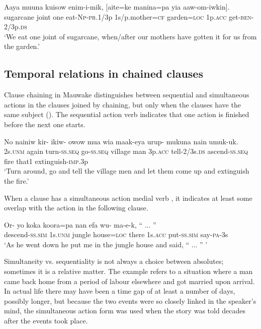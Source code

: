 \ea%
\label{ex:8:x1470}
\gll Aaya  muuna  kuisow  enim-i-mik,  [aite=ke manina=pa  yia  aaw-om-iwkin].   \\
sugarcane  joint  one  eat-\textsc{Np}-\textsc{pr}.1/3p 1s/p.mother=\textsc{cf} garden=\textsc{loc} 1p.\textsc{acc} get-\textsc{ben}-2/3p.\textsc{ds}\\
\glt`We eat one joint of sugarcane, when/after our mothers have gotten it for us from the garden.'
\z


\subsection{Temporal relations in chained clauses}

Clause chaining in Mauwake distinguishes between sequential and simultaneous actions in the clauses joined by chaining, but only when the clauses have the same subject (). The sequential action verb  indicates that one action is finished before the next one starts. 

\ea%
\label{ex:8:x1431}
\gll No  nainiw  kir-  ikiw-  owow  mua  wia maak-eya  urup-  mukuna  nain  umuk-uk. \\
2s.\textsc{unm} again  turn-\textsc{ss}.\textsc{seq} go-\textsc{ss}.\textsc{seq} village  man  3p.\textsc{acc} tell-2/3s.\textsc{ds}  ascend-\textsc{ss}.\textsc{seq} fire  that1 extinguish-\textsc{imp}.3p\\
\glt`Turn around, go and tell the village men and let them come up and extinguish the fire.'
\z


When a clause has a simultaneous action medial verb , it indicates at least some overlap with the action in the following clause. 

\ea%
\label{ex:8:x1432}
\gll Or-  yo  koka  koora=pa  nan  efa wu-  ma-e-k,  `` ... '' \\
descend-\textsc{ss}.\textsc{sim} 1s.\textsc{unm} jungle house=\textsc{loc} there 1s.\textsc{acc} put-\textsc{ss}.\textsc{sim} say-\textsc{pa}-3s\\
\glt`As he went down he put me in the jungle house and said, `` ... '' '
\z


Simultaneity vs. sequentiality is not always a choice between absolutes; sometimes it is a relative matter. The example  refers to a situation where a man came back home from a period of labour elsewhere and got married upon arrival. In actual life there may have been a time gap of at least a number of days, possibly longer, but because the two events were so closely linked in the speaker's mind, the simultaneous action form was used when the story was told decades after the events took place.

